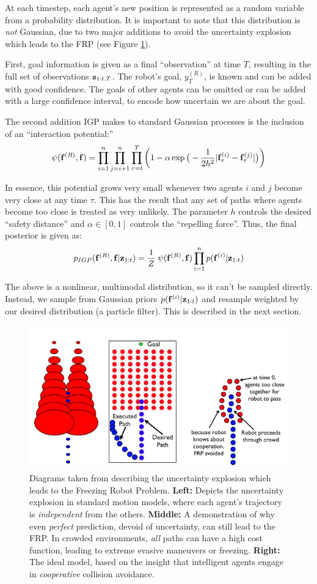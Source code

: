 \documentclass[a4paper,11pt,headings=small]{article}
\begin{document}
At each timestep, each agent's new position is represented as a random variable from a probability distribution. It is important to note that this distribution is \emph{not} Gaussian, due to two major additions to avoid the uncertainty explosion which leads to the FRP (see Figure \ref{uncertainty}).

First, goal information is given as a final ``observation'' at time $T$, resulting in the full set of observations $\mathbf{z}_{1:t,T}$. The robot's goal, $y_T^{(R)}$, is known and can be added with good confidence. The goals of other agents can be omitted or can be added with a large confidence interval, to encode how uncertain we are about the goal.

The second addition IGP makes to standard Gaussian processes is the inclusion of an ``interaction potential:''
$$ \psi(\mathbf{f}^{(R)},\mathbf{f}) = \prod_{i=1}^n \prod_{j=i+1}^n \prod_{\tau=t}^T \left( 1 - \alpha \exp\big(-\frac{1}{2h^2}|\mathbf{f}^{(i)}_{\tau} - \mathbf{f}^{(j)}_{\tau}|\big) \right)$$

In essence, this potential grows very small whenever two agents $i$ and $j$ become very close at any time $\tau$. This has the result that any set of paths where agents become too close is treated as very unlikely. The parameter $h$ controls the desired ``safety distance'' and $\alpha \in [0, 1]$ controls the ``repelling force''. Thus, the final posterior is given as:
$$ p_{IGP}(\mathbf{f}^{(R)},\mathbf{f} | \mathbf{z}_{1:t}) = \frac{1}{Z} \; \psi(\mathbf{f}^{(R)},\mathbf{f}) \prod_{i=1}^n p(\mathbf{f}^{(i)} | \mathbf{z}_{1:t}) $$


The above is a nonlinear, multimodal distribution, so it can't be sampled directly. Instead, we sample from Gaussian priors $p(\mathbf{f}^{(i)}|\mathbf{z}_{1:t})$ and resample weighted by our desired distribution (a particle filter). This is described in the next section.

\begin{figure}[h]
\centering
\includegraphics[width=.75\textwidth]{uncertainty-explosion.png}
\caption{Diagrams taken from \cite{Trautman2010} describing the uncertainty explosion which leads to the Freezing Robot Problem. \textbf{Left:} Depicts the uncertainty explosion in standard motion models, where each agent's trajectory is \emph{independent} from the others. \textbf{Middle:} A demonstration of why even \emph{perfect} prediction, devoid of uncertainty, can still lead to the FRP. In crowded environments, \emph{all} paths can have a high cost function, leading to extreme evasive maneuvers or freezing. \textbf{Right:} The ideal model, based on the insight that intelligent agents engage in \emph{cooperative} collision avoidance.}
\label{uncertainty}
\end{figure}
\end{document}

